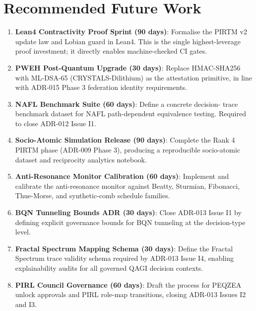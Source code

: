 \documentclass[12pt,a4paper]{article}
\theoremstyle{definition}
\theoremstyle{plain}
\theoremstyle{remark}
\begin{document}
\newpage

\section{Recommended Future Work}
\label{sec:future}

\begin{enumerate}
  \item \textbf{Lean4 Contractivity Proof Sprint (90 days)}: Formalise the
    PIRTM v2 update law and Lobian guard in Lean4. This is the single
    highest-leverage proof investment; it directly enables machine-checked
    CI gates.

  \item \textbf{PWEH Post-Quantum Upgrade (30 days)}: Replace HMAC-SHA256
    with ML-DSA-65 (CRYSTALS-Dilithium) as the attestation primitive, in
    line with ADR-015 Phase 3 federation identity requirements.

  \item \textbf{NAFL Benchmark Suite (60 days)}: Define a concrete decision-
    trace benchmark dataset for NAFL path-dependent equivalence testing.
    Required to close ADR-012 Issue I1.

  \item \textbf{Socio-Atomic Simulation Release (90 days)}: Complete the Rank 4
    PIRTM phase (ADR-009 Phase 3), producing a reproducible socio-atomic
    dataset and reciprocity analytics notebook.

  \item \textbf{Anti-Resonance Monitor Calibration (60 days)}: Implement and
    calibrate the anti-resonance monitor against Beatty, Sturmian, Fibonacci,
    Thue-Morse, and synthetic-comb schedule families.

  \item \textbf{BQN Tunneling Bounds ADR (30 days)}: Close ADR-013 Issue I1
    by defining explicit governance bounds for BQN tunneling at the
    decision-type level.

  \item \textbf{Fractal Spectrum Mapping Schema (30 days)}: Define the Fractal
    Spectrum trace validity schema required by ADR-013 Issue I4, enabling
    explainability audits for all governed QAGI decision contexts.

  \item \textbf{PIRL Council Governance (60 days)}: Draft the process for
    PEQZEA unlock approvals and PIRL role-map transitions, closing ADR-013
    Issues I2 and I3.
\end{enumerate}
\end{document}

